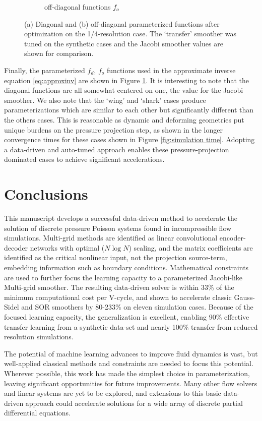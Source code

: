 \documentclass[review]{elsarticle}
\begin{document}
\begin{figure}
\begin{subfigure}[b]{0.47\textwidth}
        \caption{off-diagonal functions $f_o$}
    \end{subfigure}
        \caption{(a) Diagonal and (b) off-diagonal parameterized functions after optimization on the 1/4-resolution case. The `transfer' smoother was tuned on the synthetic cases and the Jacobi smoother values are shown for comparison.}
        \label{fig:tuned inverse}
\end{figure}

Finally, the parameterized $f_d,\,f_o$ functions used in the approximate inverse equation \ref{eq:approxinv} are shown in Figure \ref{fig:tuned inverse}. It is interesting to note that the diagonal functions are all somewhat centered on one, the value for the Jacobi smoother. We also note that the `wing' and `shark' cases produce parameterizations which are similar to each other but significantly different than the others cases. This is reasonable as dynamic and deforming geometries put unique burdens on the pressure projection step, as shown in the longer convergence times for these cases shown in Figure \ref{fig:simulation time}. Adopting a data-driven and auto-tuned approach enables these pressure-projection dominated cases to achieve significant accelerations.

\section{Conclusions}

This manuscript develops a successful data-driven method to accelerate the solution of discrete pressure Poisson systems found in incompressible flow simulations. Multi-grid methods are identified as linear convolutional encoder-decoder networks with optimal ($N\log N$) scaling, and the matrix coefficients are identified as the critical nonlinear input, not the projection source-term, embedding information such as boundary conditions. Mathematical constraints are used to further focus the learning capacity to a parameterized Jacobi-like Multi-grid smoother. The resulting data-driven solver is within 33\% of the minimum computational cost per V-cycle, and shown to accelerate classic Gauss-Sidel and SOR smoothers by 80-233\% on eleven simulation cases. Because of the focused learning capacity, the generalization is excellent, enabling 90\% effective transfer learning from a synthetic data-set and nearly 100\% transfer from reduced resolution simulations. 

The potential of machine learning advances to improve fluid dynamics is vast, but well-applied classical methods and constraints are needed to focus this potential. Wherever possible, this work has made the simplest choice in parameterization, leaving significant opportunities for future improvements. Many other flow solvers and linear systems are yet to be explored, and extensions to this basic data-driven approach could accelerate solutions for a wide array of discrete partial differential equations. 



\end{document}
